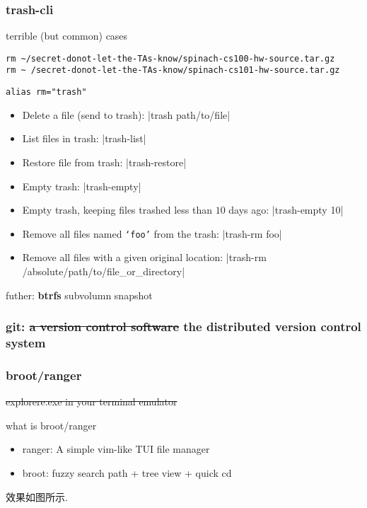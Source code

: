 \documentclass[8pt,t]{beamer}
\begin{document}
\begin{frame}[fragile]
	\frametitle{trash-cli}

	\begin{alertblock}{terrible (but common) cases}
		\begin{verbatim}
rm ~/secret-donot-let-the-TAs-know/spinach-cs100-hw-source.tar.gz
rm ~ /secret-donot-let-the-TAs-know/spinach-cs101-hw-source.tar.gz
		\end{verbatim}
	\end{alertblock}

	\vfill

	\begin{examples}
		\begin{verbatim}
alias rm="trash"
		\end{verbatim}

		{\scriptsize{
			\begin{itemize}
				\item Delete a file (send to trash): |trash path/to/file|
				\item List files in trash: |trash-list|
				\item Restore file from trash: |trash-restore|
				\item Empty trash: |trash-empty|
				\item Empty trash, keeping files trashed less than $10$ days ago: |trash-empty 10|
				\item Remove all files named \texttt{`foo'} from the trash: |trash-rm foo|
				\item Remove all files with a given original location: |trash-rm /absolute/path/to/file_or_directory|
			\end{itemize}
		}}
	\end{examples}

	futher: \textbf{btrfs} subvolumn snapshot
\end{frame}

\begin{frame}
	\frametitle{git: \sout{a version control software} the distributed version control system}
\end{frame}


\begin{frame}
	\frametitle{broot/ranger}
	\sout{explorere.exe in your terminal emulator}
	\begin{block}{what is broot/ranger}
		\begin{itemize}
			\item ranger: A simple vim-like TUI file manager
			\item broot: fuzzy search path + tree view + quick cd
		\end{itemize}
	\end{block}


	\vfill

	\begin{examples}
		效果如图所示.
	\end{examples}
\end{frame}
\end{document}
